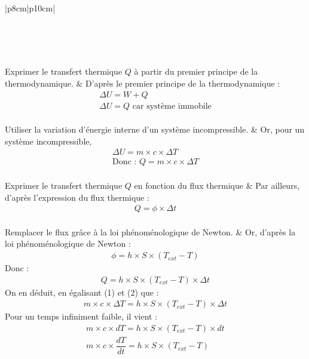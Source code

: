 \documentclass[a4paper,12pt,fleqn]{scrartcl}%
\begin{document}
\begin{xtabular}{|p{8cm}|p{10cm}|}
\begin{center}
\\
		\end{center} \\
		\hline
		\\
		\hline
		Exprimer le transfert thermique $Q$ à partir du premier principe de la thermodynamique. & D'après le premier principe de la thermodynamique :
		\begin{eqnarray}
			\Delta U = W + Q \nonumber\\
			\Delta U = Q \text{ car système immobile} \nonumber
		\end{eqnarray}\\
		Utiliser la variation d'énergie interne d'un système incompressible. & Or, pour un système incompressible,
		\begin{eqnarray}
			\Delta U = m \times c \times \Delta T \nonumber\\
			\text{Donc : } Q = m \times c \times \Delta T 
		\end{eqnarray}\\
		Exprimer le transfert thermique $Q$ en fonction du flux thermique & Par ailleurs, d'après l'expression du flux thermique : 
		\begin{eqnarray}
			Q = \phi \times \Delta t \nonumber
		\end{eqnarray}\\
		Remplacer le flux grâce à la loi phénoménologique de Newton. &
		Or, d'après la loi phénoménologique de Newton : 
		\begin{eqnarray}
			\phi = h \times S \times (T_{ext} - T) \nonumber
		\end{eqnarray}
		Donc : 
		\begin{eqnarray}
			Q = h \times S \times (T_{ext} - T) \times \Delta t 
		\end{eqnarray}
		On en déduit, en égalisant (1) et (2) que :
		\begin{eqnarray}
			m\times c \times \Delta T = h \times S \times (T_{ext} - T) \times \Delta t \nonumber
		\end{eqnarray}
		Pour un temps infiniment faible, il vient :
		\begin{eqnarray}
			m\times c \times dT = h \times S \times (T_{ext} - T) \times dt \nonumber\\
			m\times c \times \dfrac{dT}{dt} = h \times S \times (T_{ext}-T) \nonumber

\end{eqnarray}
\end{xtabular}
\end{document}
